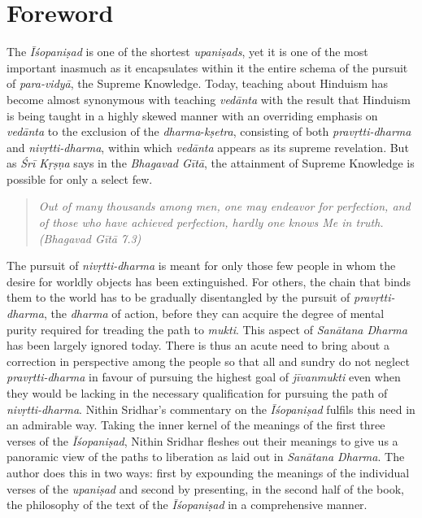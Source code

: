 \chapter{Foreword}

{\leftskip=10pt\rightskip=10pt
The \emph{Īśopaniṣad} is one of the shortest \emph{upaniṣads}, yet it is one of the most important inasmuch as it encapsulates within it the entire schema of the pursuit of \emph{para-vidyā}, the Supreme Knowledge. Today, teaching about Hinduism has become almost synonymous with teaching \emph{vedānta} with the result that Hinduism is being taught in a highly skewed manner with an overriding emphasis on \emph{vedānta} to the exclusion of the \emph{dharma}-\emph{kṣetra}, consisting of both \emph{pravṛtti-dharma} and \emph{nivṛtti-dharma}, within which \emph{vedānta} appears as its supreme revelation. But as \emph{Śrī Kṛṣṇa} says in the \emph{Bhagavad Gītā}, the attainment of Supreme Knowledge is possible for only a select few.\par}

\begin{quote}
\emph{Out of many thousands among men, one may endeavor for perfection, and of those who have achieved perfection, hardly one knows Me in truth. (Bhagavad Gītā 7.3)}
\end{quote}

{\leftskip=10pt\rightskip=10pt
The pursuit of \emph{nivṛtti-dharma} is meant for only those few people in whom the desire for worldly objects has been extinguished. For others, the chain that binds them to the world has to be gradually disentangled by the pursuit of \emph{pravṛtti-dharma}, the \emph{dharma} of action, before they can acquire the degree of mental purity required for treading the path to \emph{mukti}. This aspect of \emph{Sanātana Dharma} has been largely ignored today. There is thus an acute need to bring about a correction in perspective among the people so that all and sundry do not neglect \emph{pravṛtti-dharma} in favour of pursuing the highest goal of \emph{jīvanmukti} even when they would be lacking in the necessary qualification for pursuing the path of \emph{nivṛtti-dharma}. Nithin Sridhar's commentary on the \emph{Īśopaniṣad} fulfils this need in an admirable way. Taking the inner kernel of the meanings of the first three verses of the \emph{Īśopaniṣad}, Nithin Sridhar fleshes out their meanings to give us a panoramic view of the paths to liberation as laid out in \emph{Sanātana Dharma}. The author does this in two ways: first by expounding the meanings of the individual verses of the \emph{upaniṣad} and second by presenting, in the second half of the book, the philosophy of the text of the \emph{Īśopaniṣad} in a comprehensive manner.\par}
\bigskip


